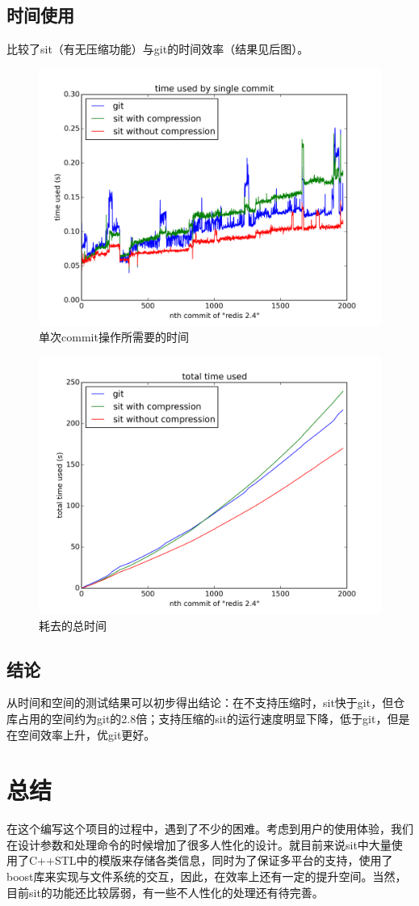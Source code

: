 \documentclass[11pt, a4paper, UTF8]{ctexart}
\begin{document}
\subsection{时间使用}
比较了sit（有无压缩功能）与git的时间效率（结果见后图）。
\begin{figure}[H]
	\centering
	\includegraphics[scale=0.75]{figure_1.png}
	\caption{单次commit操作所需要的时间}
\end{figure}
\begin{figure}[H]
	\centering
	\includegraphics[scale=0.75]{figure_2.png}
	\caption{耗去的总时间}
\end{figure}
\subsection{结论}
从时间和空间的测试结果可以初步得出结论：在不支持压缩时，sit快于git，但仓库占用的空间约为git的2.8倍；支持压缩的sit的运行速度明显下降，低于git，但是在空间效率上升，优git更好。

\section{总结}
在这个编写这个项目的过程中，遇到了不少的困难。考虑到用户的使用体验，我们在设计参数和处理命令的时候增加了很多人性化的设计。就目前来说sit中大量使用了C++STL中的模版来存储各类信息，同时为了保证多平台的支持，使用了boost库来实现与文件系统的交互，因此，在效率上还有一定的提升空间。当然，目前sit的功能还比较孱弱，有一些不人性化的处理还有待完善。
\end{document}
